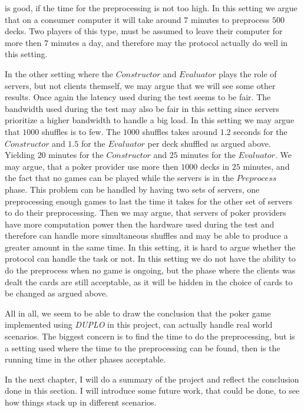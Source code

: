 \documentclass[twoside,11pt,openright]{report}
\newcommand{\DUPLO}{\textit{DUPLO} }
\begin{document}
is good, if the time for the preprocessing is not too high. In this setting we argue that on a consumer computer it will take around $7$ minutes to preprocess $500$ decks. Two players of this type, must be assumed to leave their computer for more then $7$ minutes a day, and therefore may the protocol actually do well in this setting.

In the other setting where the $Constructor$ and $Evaluator$ plays the role of servers, but not clients themself, we may argue that we will see some other results. Once again the latency used during the test seems to be fair. The bandwidth used during the test may also be fair in this setting since servers prioritize a higher bandwidth to handle a big load. In this setting we may argue that $1000$ shuffles is to few.  The $1000$ shuffles takes around $1.2$ seconds for the $Constructor$ and $1.5$ for the $Evaluator$ per deck shuffled as argued above. Yielding $20$ minutes for the $Constructor$ and $25$ minutes for the $Evaluator$. We may argue, that a poker provider use more then $1000$ decks in $25$ minutes, and the fact that no games can be played while the servers is in the $Preprocess$ phase. This problem can be handled by having two sets of servers, one preprocessing enough games to last the time it takes for the other set of servers to do their preprocessing. Then we may argue, that servers of poker providers have more computation power then the hardware used during the test and therefore can handle more simultaneous shuffles and may be able to produce a greater amount in the same time. In this setting, it is hard to argue whether the protocol can handle the task or not. In this setting we do not have the ability to do the preprocess when no game is ongoing, but the phase where the clients was dealt the cards are still acceptable, as it will be hidden in the choice of cards to be changed as argued above.

\bigskip

All in all, we seem to be able to draw the conclusion that the poker game implemented using \DUPLO in this project, can actually handle real world scenarios. The biggest concern is to find the time to do the preprocessing, but is a setting used where the time to the preprocessing can be found, then is the running time in the other phases acceptable.

In the next chapter, I will do a summary of the project and reflect the conclusion done in this section. I will introduce some future work, that could be done, to see how things stack up in different scenarios.
\end{document}
